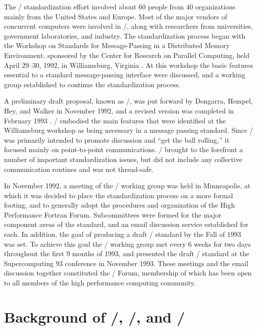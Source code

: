 The \MPI/ standardization effort involved about 60 people from 40 organizations
mainly from the United States and Europe. Most of the major vendors of
concurrent computers were involved in \MPI/, along with researchers from
universities, government laboratories, and industry. The standardization
process began with the Workshop on
Standards for Message-Passing in a Distributed Memory Environment,
sponsored by the Center for Research on Parallel Computing, held April 29--30,
1992, in Williamsburg, Virginia
\cite{walker92b}. At this workshop the basic features essential
to a standard message-passing interface were discussed, and a working group
established to continue the standardization process.

A preliminary draft proposal, known as \MPII/, was put forward by Dongarra,
Hempel, Hey, and Walker in November 1992, and a revised version was completed
in February 1993 \cite{mpi1}. \MPII/ embodied the main features that were
identified at the Williamsburg workshop as being necessary in a message
passing standard.  Since \MPII/ was primarily intended to promote discussion
and ``get the ball rolling,'' it focused mainly on point-to-point
communications.  \MPII/ brought to the forefront a number of important
standardization issues, but did not include any collective communication
routines and was not thread-safe.

In November 1992, a
meeting of the \MPI/ working group was held in Minneapolis, at which it was
decided to place the standardization process on a more formal footing, and
to generally adopt the procedures and organization of the High Performance
Fortran Forum. Subcommittees were formed for the major
component areas of the standard, and an email discussion service established
for each. In addition, the goal of producing a draft \MPI/ standard by the Fall
of 1993 was set.
To achieve this goal the \MPI/ working group met every
6 weeks for two days throughout the first 9 months of 1993, and
presented the draft \MPI/ standard at the
Supercomputing 93 conference in November 1993. These meetings and the email
discussion together constituted the \MPI/ Forum, membership of which has been open
to all members of the high performance computing community.


\section{Background of \texorpdfstring{\MPIIDOTI/}{MPI-1.1}, \texorpdfstring{\MPIIDOTII/}{MPI-1.2}, and \texorpdfstring{\MPIIIDOTO/}{MPI-2.0}}
\label{sec:background}

